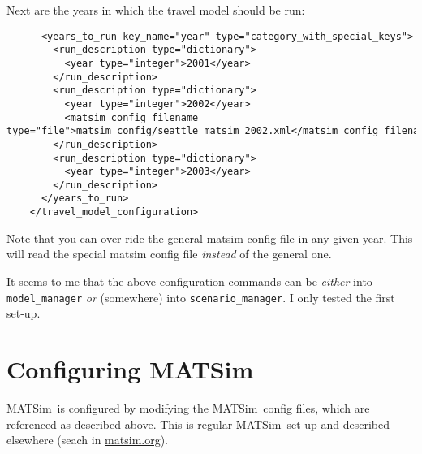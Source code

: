 \documentclass{article}
\def\matsim{MATSim}
\begin{document}
Next are the years in which the travel model should be run:
{\footnotesize
\begin{verbatim}
      <years_to_run key_name="year" type="category_with_special_keys">
        <run_description type="dictionary">
          <year type="integer">2001</year>
        </run_description>
        <run_description type="dictionary">
          <year type="integer">2002</year>
          <matsim_config_filename type="file">matsim_config/seattle_matsim_2002.xml</matsim_config_filename>
        </run_description>
        <run_description type="dictionary">
          <year type="integer">2003</year>
        </run_description>
      </years_to_run>
    </travel_model_configuration>
\end{verbatim}
}
Note that you can over-ride the general matsim config file in any given
year.  This will read the special matsim config file \emph{instead} of
the general one.

It seems to me that the above configuration commands can be
\emph{either} into \verb$model_manager$ \emph{or} (somewhere) into
\verb$scenario_manager$.  I only tested the first set-up.


\section{Configuring \matsim}

\matsim\ is configured by modifying the \matsim\ config files, which
are referenced as described above.  This is regular \matsim\ set-up
and described elsewhere (seach in \url{matsim.org}).
\end{document}
